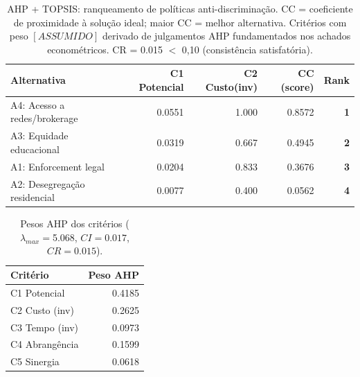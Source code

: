 \begin{table}[H]
  \centering
  \caption{AHP + TOPSIS: ranqueamento de políticas anti-discriminação.
           CC = coeficiente de proximidade à solução ideal;
           maior CC = melhor alternativa.
           Critérios com peso $[ASSUMIDO]$ derivado de julgamentos AHP
           fundamentados nos achados econométricos.
           CR = 0.015 $<$ 0,10 (consistência satisfatória).}
  \label{tab:po_topsis}
  \small
  \begin{tabular}{lrrrr}
    \toprule
    Alternativa & C1 Potencial & C2 Custo(inv) & CC (score) & Rank \\
    \midrule
  A4: Acesso a redes/brokerage & 0.0551 & 1.000 & 0.8572 & \textbf{1} \\
  A3: Equidade educacional & 0.0319 & 0.667 & 0.4945 & \textbf{2} \\
  A1: Enforcement legal & 0.0204 & 0.833 & 0.3676 & \textbf{3} \\
  A2: Desegregação residencial & 0.0077 & 0.400 & 0.0562 & \textbf{4} \\
    \bottomrule
  \end{tabular}
\end{table}

\begin{table}[H]
  \centering
  \caption{Pesos AHP dos critérios ($\lambda_{max}=$5.068,
           $CI = 0.017$, $CR = 0.015$).}
  \label{tab:po_ahp_pesos}
  \small
  \begin{tabular}{lr}
    \toprule
    Critério & Peso AHP \\
    \midrule
  C1 Potencial & 0.4185 \\
  C2 Custo (inv) & 0.2625 \\
  C3 Tempo (inv) & 0.0973 \\
  C4 Abrangência & 0.1599 \\
  C5 Sinergia & 0.0618 \\
    \bottomrule
  \end{tabular}
\end{table}
